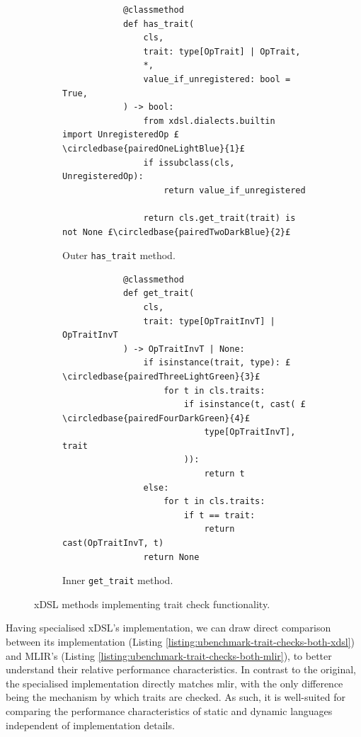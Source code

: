 \begin{figure}[H]
    \begin{subfigure}[b]{0.45\textwidth}
       \centering
        \begin{verbatim}
            @classmethod
            def has_trait(
                cls,
                trait: type[OpTrait] | OpTrait,
                *,
                value_if_unregistered: bool = True,
            ) -> bool:
                from xdsl.dialects.builtin import UnregisteredOp £\circledbase{pairedOneLightBlue}{1}£
                if issubclass(cls, UnregisteredOp):
                    return value_if_unregistered

                return cls.get_trait(trait) is not None £\circledbase{pairedTwoDarkBlue}{2}£
        \end{verbatim}
        \footnotesize\vspace{1.5em}
        \caption{Outer \texttt{has_trait} method.}
        \label{listing:ubenchmark-trait-checks-xdsl-has}
    \end{subfigure}
    \hfill
    \begin{subfigure}[b]{0.45\textwidth}
        \centering
        \begin{verbatim}
            @classmethod
            def get_trait(
                cls,
                trait: type[OpTraitInvT] | OpTraitInvT
            ) -> OpTraitInvT | None:
                if isinstance(trait, type): £\circledbase{pairedThreeLightGreen}{3}£
                    for t in cls.traits:
                        if isinstance(t, cast( £\circledbase{pairedFourDarkGreen}{4}£
                            type[OpTraitInvT], trait
                        )):
                            return t
                else:
                    for t in cls.traits:
                        if t == trait:
                            return cast(OpTraitInvT, t)
                return None
        \end{verbatim}
        \caption{Inner \texttt{get_trait} method.}
        \label{listing:ubenchmark-trait-checks-xdsl-get}
    \end{subfigure}
    \vspace{1em}
    \captionsetup{name=Listing}
    \caption{xDSL methods implementing trait check functionality.}
    \label{listing:ubenchmark-trait-checks-xdsl}
\end{figure}

Having specialised xDSL's implementation, we can draw direct comparison between its implementation (Listing \ref{listing:ubenchmark-trait-checks-both-xdsl}) and MLIR's (Listing \ref{listing:ubenchmark-trait-checks-both-mlir}), to better understand their relative performance characteristics.
In contrast to the original, the specialised implementation directly matches \ac{mlir}, with the only difference being the mechanism by which traits are checked.
As such, it is well-suited for comparing the performance characteristics of static and dynamic languages independent of implementation details.

